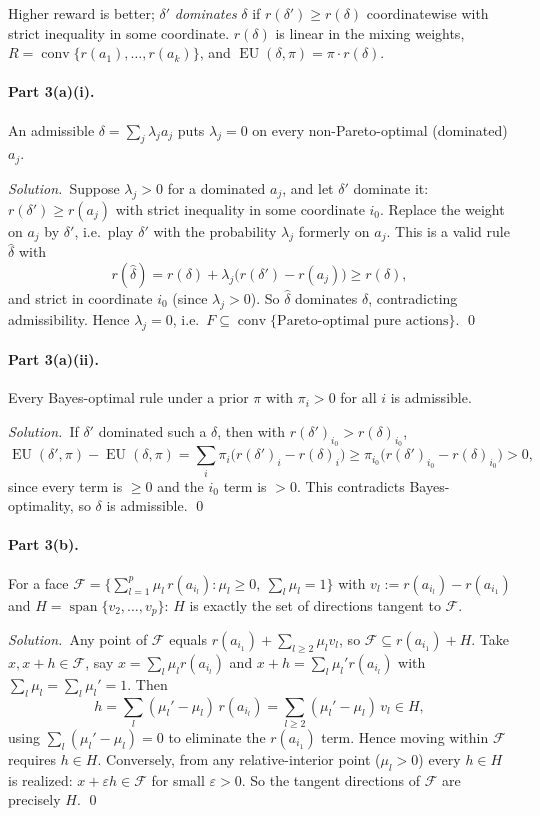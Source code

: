 \documentclass[11pt]{article}
\newcommand{\rd}{r(\delta)}
\DeclareMathOperator{\EU}{EU}
\theoremstyle{plain}
\newcommand{\soln}{\medskip\noindent\textit{Solution.}\ }
\begin{document}
Higher reward is better; $\delta'$ \emph{dominates} $\delta$ if $r(\delta')\ge\rd$ coordinatewise with strict inequality in some coordinate. $\rd$ is linear in the mixing weights, $R=\operatorname{conv}\{r(a_1),\dots,r(a_k)\}$, and $\EU(\delta,\pi)=\pi\cdot\rd$.

\paragraph{Part 3(a)(i).} An admissible $\delta=\sum_j\lambda_j a_j$ puts $\lambda_j=0$ on every non-Pareto-optimal (dominated) $a_j$.

\soln Suppose $\lambda_j>0$ for a dominated $a_j$, and let $\delta'$ dominate it: $r(\delta')\ge r(a_j)$ with strict inequality in some coordinate $i_0$. Replace the weight on $a_j$ by $\delta'$, i.e.\ play $\delta'$ with the probability $\lambda_j$ formerly on $a_j$. This is a valid rule $\hat\delta$ with
\[
  r(\hat\delta)=\rd+\lambda_j\big(r(\delta')-r(a_j)\big)\ge\rd,
\]
and strict in coordinate $i_0$ (since $\lambda_j>0$). So $\hat\delta$ dominates $\delta$, contradicting admissibility. Hence $\lambda_j=0$, i.e.\ $F\subseteq\operatorname{conv}\{\text{Pareto-optimal pure actions}\}$. \qed

\paragraph{Part 3(a)(ii).} Every Bayes-optimal rule under a prior $\pi$ with $\pi_i>0$ for all $i$ is admissible.

\soln If $\delta'$ dominated such a $\delta$, then with $r(\delta')_{i_0}>\rd_{i_0}$,
\[
  \EU(\delta',\pi)-\EU(\delta,\pi)=\sum_i\pi_i\big(r(\delta')_i-\rd_i\big)\ge\pi_{i_0}\big(r(\delta')_{i_0}-\rd_{i_0}\big)>0,
\]
since every term is $\ge0$ and the $i_0$ term is $>0$. This contradicts Bayes-optimality, so $\delta$ is admissible. \qed

\paragraph{Part 3(b).} For a face $\mathcal F=\{\sum_{l=1}^p\mu_l\,r(a_{i_l}):\mu_l\ge0,\ \sum_l\mu_l=1\}$ with $v_l:=r(a_{i_l})-r(a_{i_1})$ and $H=\operatorname{span}\{v_2,\dots,v_p\}$: $H$ is exactly the set of directions tangent to $\mathcal F$.

\soln Any point of $\mathcal F$ equals $r(a_{i_1})+\sum_{l\ge2}\mu_l v_l$, so $\mathcal F\subseteq r(a_{i_1})+H$. Take $x,x+h\in\mathcal F$, say $x=\sum_l\mu_l r(a_{i_l})$ and $x+h=\sum_l\mu_l' r(a_{i_l})$ with $\sum_l\mu_l=\sum_l\mu_l'=1$. Then
\[
  h=\sum_l(\mu_l'-\mu_l)\,r(a_{i_l})=\sum_{l\ge2}(\mu_l'-\mu_l)\,v_l\in H,
\]
using $\sum_l(\mu_l'-\mu_l)=0$ to eliminate the $r(a_{i_1})$ term. Hence moving within $\mathcal F$ requires $h\in H$. Conversely, from any relative-interior point ($\mu_l>0$) every $h\in H$ is realized: $x+\varepsilon h\in\mathcal F$ for small $\varepsilon>0$. So the tangent directions of $\mathcal F$ are precisely $H$. \qed
\end{document}
